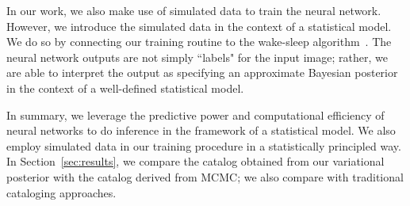 In our work, we also make use of simulated data to train the neural network. However, we introduce the simulated data in the context of a statistical model. We do so by 
connecting our training routine to the wake-sleep algorithm~\cite{Hinton1995wake_sleep}. 
The neural network outputs are not simply ``labels" for the input image; rather, we are able to interpret the output as specifying an approximate Bayesian posterior in the context of a well-defined statistical model. 

In summary, we leverage the predictive power and computational efficiency of neural networks to do 
inference in the framework of a statistical model. 
We also employ simulated data in our training procedure in a statistically principled way. In Section~\ref{sec:results}, we compare the catalog obtained from our variational posterior with the catalog derived from MCMC; we also compare with traditional cataloging approaches.  






